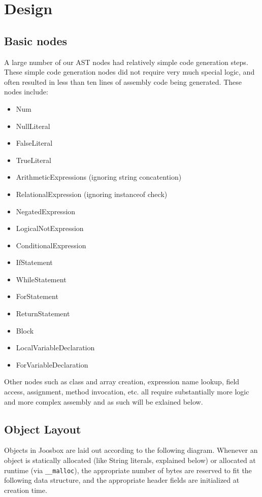\documentclass[letterpaper]{article}
\begin{document}
  \section{Design}

  \subsection{Basic nodes}

  A large number of our AST nodes had relatively simple code generation steps.
  These simple code generation nodes did not require very much special logic,
  and often resulted in less than ten lines of assembly code being generated.
  These nodes include:

  \begin{itemize}
    \item Num
    \item NullLiteral
    \item FalseLiteral
    \item TrueLiteral
    \item ArithmeticExpressions (ignoring string concatention)
    \item RelationalExpression (ignoring instanceof check)
    \item NegatedExpression
    \item LogicalNotExpression
    \item ConditionalExpression
    \item IfStatement
    \item WhileStatement
    \item ForStatement
    \item ReturnStatement
    \item Block
    \item LocalVariableDeclaration
    \item ForVariableDeclaration
  \end{itemize}

  Other nodes such as class and array creation, expression name lookup,
  field access, assignment, method invocation, etc. all require substantially
  more logic and more complex assembly and as such will be exlained below.

  \subsection{Object Layout}

  Objects in Joosbox are laid out according to the following diagram. Whenever
  an object is statically allocated (like String literals, explained below) or
  allocated at runtime (via {\tt \_\_malloc}), the appropriate number of bytes
  are reserved to fit the following data structure, and the appropriate header
  fields are initialized at creation time.
\end{document}
